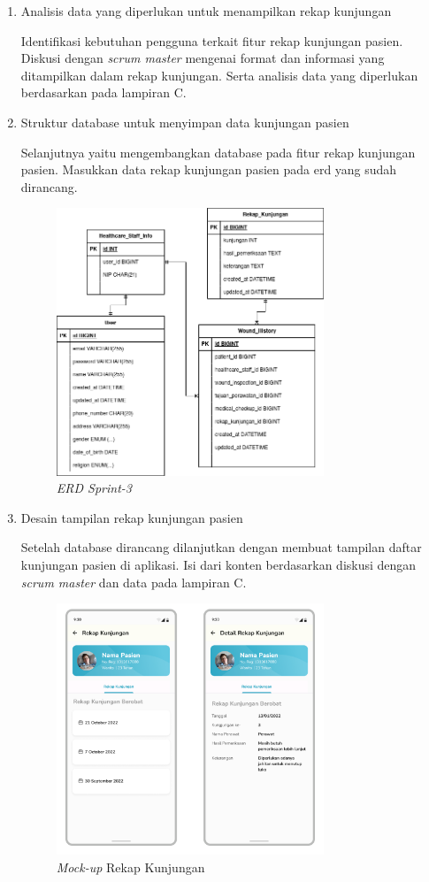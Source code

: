 \begin{enumerate}
\item Analisis data yang diperlukan untuk menampilkan rekap kunjungan

Identifikasi kebutuhan pengguna terkait fitur rekap kunjungan pasien. Diskusi dengan \textit{scrum master} mengenai format dan informasi yang ditampilkan dalam rekap kunjungan. Serta analisis data yang diperlukan berdasarkan pada lampiran C.
\item Struktur database untuk menyimpan data kunjungan pasien

Selanjutnya yaitu mengembangkan database pada fitur rekap kunjungan pasien. Masukkan data rekap kunjungan pasien pada erd yang sudah dirancang.
	\begin{figure}[H]
		\centering
		\includegraphics[keepaspectratio, width=8cm]{gambar/erd_sprint_3}
		\caption{\textit{ERD Sprint-3}}
		\label{gambar:erd_sprint_3}
	\end{figure}
\item Desain tampilan rekap kunjungan pasien

Setelah database dirancang dilanjutkan dengan membuat tampilan daftar kunjungan pasien di aplikasi. Isi dari konten berdasarkan diskusi dengan \textit{scrum master} dan data pada lampiran C.
	\begin{figure}[H]
		\centering
		\includegraphics[keepaspectratio, width=8cm]{gambar/tampilan_rekap_kunjungan}
		\caption{\textit{Mock-up} Rekap Kunjungan}
		\label{gambar:tampilan_rekap_kunjungan}
	\end{figure}


\end{enumerate}
